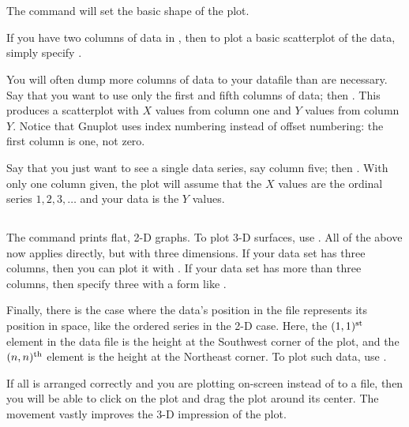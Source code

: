 \section{} The  command will set the basic shape of
the plot. 

If you have two columns of data in , then to plot a basic
scatterplot of the data, simply specify . 

You will often dump more columns of data to your datafile than are
necessary. Say that you want to use only the first and fifth columns of
data; then . This produces a scatterplot
with $X$ values from column one and $Y$ values from column $Y$.
Notice that Gnuplot uses index numbering instead of offset numbering:
the first column is one, not zero.

Say that you just want to see a single data series, say column five; then 
. With only one column given, the plot will
assume that the $X$ values are the ordinal series $1, 2, 3, \dots$ and
your data is the $Y$ values.

\subsection{} The  command prints flat, 2-D graphs.
To plot 3-D surfaces, use . All of the above now applies
directly, but with three dimensions. If your data set has three columns, then
you can plot it with . If your data set has more
than three columns, then specify three with a form like . 

Finally, there is the case where the data's  position in the file
represents its position in space, like the ordered series in the 2-D
case. Here, the $(1,1)^{\rm st}$ element in the data file is the
height at the Southwest corner of the plot, and the $(n,n)^{\rm th}$
element is the height at the Northeast corner. To plot such data, use
.

If all is arranged correctly and you are plotting on-screen instead of
to a file, then you will be able to click on the plot and drag the plot
around its center. The movement vastly improves the 3-D impression of the plot.

